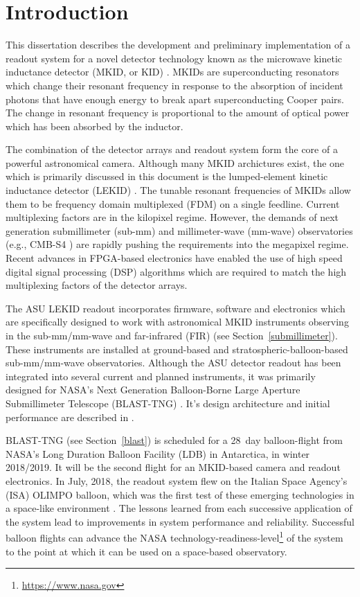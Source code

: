 \chapter{Introduction}\label{intro}

This dissertation describes the development and preliminary implementation of a readout system for a novel detector technology known as the microwave kinetic inductance detector (MKID, or KID) \citep{day2003broadband, mazin2005microwave}. MKIDs are superconducting resonators which change their resonant frequency in response to the absorption of incident photons that have enough energy to break apart superconducting Cooper pairs. The change in resonant frequency is proportional to the amount of optical power which has been absorbed by the inductor.

The combination of the detector arrays and readout system form the core of a powerful astronomical camera. Although many MKID archictures exist, the one which is primarily discussed in this document is the lumped-element kinetic inductance detector (LEKID) \citep{doyle2008lumped}. The tunable resonant frequencies of MKIDs allow them to be frequency domain multiplexed (FDM) on a single feedline. Current multiplexing factors are in the kilopixel regime. However, the demands of next generation submillimeter (sub-mm) and millimeter-wave (mm-wave) observatories (e.g., CMB-S4 \cite{abitbol2017cmb}) are rapidly pushing the requirements into the megapixel regime. Recent advances in FPGA-based electronics have enabled the use of high speed digital signal processing (DSP) algorithms which are required to match the high multiplexing factors of the detector arrays.

The ASU LEKID readout incorporates firmware, software and electronics which are specifically designed to work with astronomical MKID instruments observing in the sub-mm/mm-wave and far-infrared (FIR) (see Section~\ref{submillimeter}). These instruments are installed at ground-based and stratospheric-balloon-based sub-mm/mm-wave observatories. Although the ASU detector readout has been integrated into several current and planned instruments, it was primarily designed for NASA's Next Generation Balloon-Borne Large Aperture Submillimeter Telescope (BLAST-TNG) \citep{dober}. It's design architecture and initial performance are described in \citet{gordon2016}.

BLAST-TNG (see Section~\ref{blast}) is scheduled for a 28~day balloon-flight from NASA's Long Duration Balloon Facility (LDB) in Antarctica, in winter 2018/2019. It will be the second flight for an MKID-based camera and readout electronics. In July, 2018, the readout system flew on the Italian Space Agency's (ISA) OLIMPO balloon, which was the first test of these emerging technologies in a space-like environment \citep{masi2019kinetic}. The lessons learned from each successive application of the system lead to improvements in system performance and reliability. Successful balloon flights can advance the NASA technology-readiness-level\footnote{\url{https://www.nasa.gov}} of the system to the point at which it can be used on a space-based observatory.

